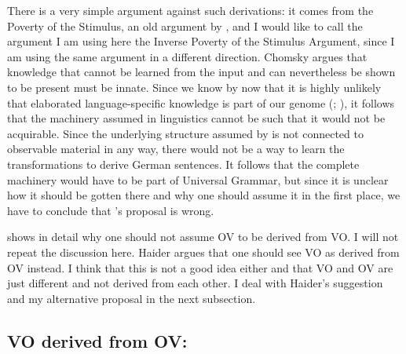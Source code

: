 \noindent
There is a very simple argument against such derivations: it comes from the Poverty of the
Stimulus, an old argument by \citet[]{Chomsky80b-u}, and I would like to call the argument I
am using here the Inverse Poverty of the Stimulus Argument, since I am using the same argument in a
different direction. Chomsky argues that knowledge that cannot be learned from the
input and can nevertheless be shown to be present must be innate. Since we know by now that it is
highly unlikely that elaborated language-specific knowledge is part of our genome
(\citealt*{HCF2002a}; \cites{Bishop2002a}[Section~6.4.2.2]{Dabrowska2004a}{FM2005a}), it follows that
the machinery assumed in linguistics cannot be such that it would not be acquirable. Since the
underlying structure assumed by \citeauthor{Laenzlinger2004a} is not connected to observable
material in any way, there would not be a way to learn the transformations to derive German
sentences. It follows that the complete machinery would have to be part of Universal Grammar, but
since it is unclear how it should be gotten there and why one should assume it in the first place,
we have to conclude that \citeauthor{Kayne94a-u}'s proposal is wrong.

\largerpage[1.1]
\citet{Haider2000a} shows in detail why one should not assume OV to be derived from VO. I will not
repeat the discussion here. Haider argues that one should see VO as derived from OV instead. I think
that this is not a good idea either and that VO and OV are just different and not derived from
each other. I deal with Haider's suggestion and my alternative proposal in the next subsection.



\subsection{VO derived from OV: \citet{Haider2020a}}
\label{sec-vo-derived-from-ov}


